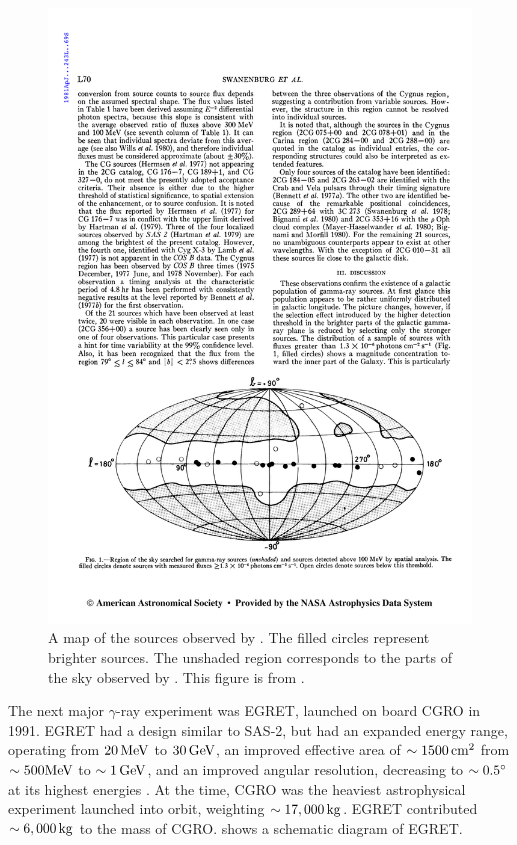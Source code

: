 \begin{figure}[htbp]
  \centering
  \includegraphics[width=\textwidth]{chapters/introduction/figures/cos_b_2nd_catalog.pdf}
  \caption{
  A map of the sources observed by \cosb. The filled circles
  represent brighter sources. The unshaded region corresponds to
  the parts of the sky observed by \cosb.  This figure is from
  \cite{swanenburg_1981_second-catalog}.
  }
\end{figure}

The next major $\gamma$-ray experiment was \ac{EGRET},
launched
on board \ac{CGRO} in 1991. \ac{EGRET} had a design
similar to \ac{SAS-2}, but had an expanded energy range, operating from
$20\,\text{MeV}$ to $30\,\text{GeV}$, an improved effective area of
$\sim1500\,\text{cm}^2$ from $\sim500\text{MeV}$ to $\sim1\,\text{GeV}$,
and an improved angular resolution, decreasing to $\sim0.5^\circ$
at its highest energies \citep{thompson_1993a_calibration-energetic}.
At the time, \ac{CGRO} was the heaviest astrophysical experiment
launched into orbit, weighting $\sim17,000\,\text{kg}$. \ac{EGRET}
contributed $\sim6,000\,\text{kg}$ to the mass of \ac{CGRO}.
 shows a schematic diagram of \ac{EGRET}.

